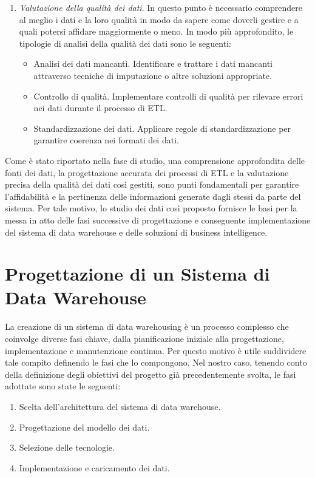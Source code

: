 \begin{enumerate}
\begin{itemize}
    \end{itemize}
    \item \textit{Valutazione della qualità dei dati}. In questo punto è necessario comprendere al meglio i dati e la loro qualità in modo da sapere come doverli gestire e a quali potersi affidare maggiormente o meno. In modo più approfondito, le tipologie di analisi della qualità dei dati sono le seguenti:
    \begin{itemize}
        \item Analisi dei dati mancanti. Identificare e trattare i dati mancanti attraverso tecniche di imputazione o altre soluzioni appropriate.
        \item Controllo di qualità. Implementare controlli di qualità per rilevare errori nei dati durante il processo di ETL.
        \item Standardizzazione dei dati. Applicare regole di standardizzazione per garantire coerenza nei formati dei dati.
    \end{itemize}
\end{enumerate}

Come è stato riportato nella fase di studio, una comprensione approfondita delle fonti dei dati, la progettazione accurata dei processi di ETL e la valutazione precisa della qualità dei dati così gestiti, sono punti fondamentali per garantire l'affidabilità e la pertinenza delle informazioni generate dagli stessi da parte del sistema. Per tale motivo, lo studio dei dati così proposto fornisce le basi per la messa in atto delle fasi successive di progettazione e conseguente implementazione del sistema di data warehouse e delle soluzioni di business intelligence.

\section{Progettazione di un Sistema di Data Warehouse}

La creazione di un sistema di data warehousing è un processo complesso che coinvolge diverse fasi chiave, dalla pianificazione iniziale alla progettazione, implementazione e manutenzione continua. Per questo motivo è utile suddividere tale compito definendo le fasi che lo compongono. Nel nostro caso, tenendo conto della definizione degli obiettivi del progetto già precedentemente svolta, le fasi adottate sono state le seguenti:
\begin{enumerate}
    \item Scelta dell'architettura del sistema di data warehouse.
    \item Progettazione del modello dei dati.
    \item Selezione delle tecnologie.
    \item Implementazione e caricamento dei dati.
\end{enumerate}

